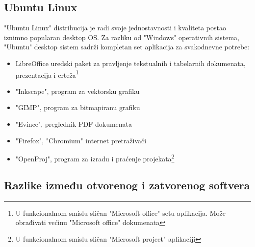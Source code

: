 \documentclass[times, utf8, seminar]{fit}
\begin{document}
\subsection{Ubuntu Linux}
"Ubuntu Linux" distribucija je radi svoje jednostavnosti i kvaliteta postao iznimno popularan desktop OS. Za razliku od "Windows" operativnih sistema, "Ubuntu" desktop sistem sadrži kompletan set aplikacija za svakodnevne potrebe:
\begin{itemize}
  \item LibreOffice uredski paket za pravljenje tekstualnih i tabelarnih dokumenata, prezentacija i crteža\footnote{U funkcionalnom smislu sličan "Microsoft office" setu aplikacija. Može obrađivati većinu "Microsoft office" dokumenata}
  \item "Inkscape", program za vektorsku grafiku \citep{inkscape}
  \item "GIMP", program za bitmapiranu grafiku
  \item "Evince", preglednik PDF dokumenata
  \item "Firefox", "Chromium" internet pretraživači
  \item "OpenProj", program za izradu i praćenje projekata\footnote{U funkcionalnom smislu sličan "Microsoft project" aplikaciji}
\end{itemize}  

\subsection{Razlike između otvorenog i zatvorenog softvera} 
\end{document}
